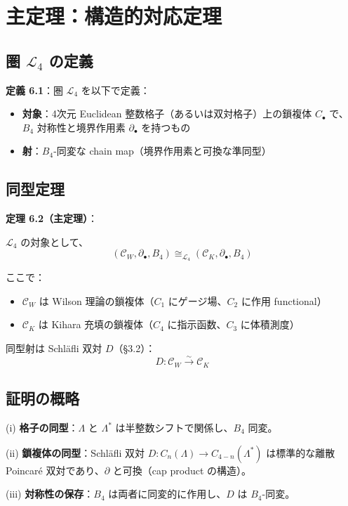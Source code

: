 \documentclass[a4paper,11pt]{ltjsarticle}
\begin{document}
\section{主定理：構造的対応定理}

\subsection{圏 $\mathcal{L}_4$ の定義}

\textbf{定義 6.1}：圏 $\mathcal{L}_4$ を以下で定義：

\begin{itemize}
\item \textbf{対象}：4次元 Euclidean 整数格子（あるいは双対格子）上の鎖複体 $C_\bullet$ で、$B_4$ 対称性と境界作用素 $\partial_\bullet$ を持つもの
\item \textbf{射}：$B_4$-同変な chain map（境界作用素と可換な準同型）
\end{itemize}

\subsection{同型定理}

\textbf{定理 6.2（主定理）}：

$\mathcal{L}_4$ の対象として、
\[ (\mathcal{C}_W, \partial_\bullet, B_4) \cong_{\mathcal{L}_4} (\mathcal{C}_K, \partial_\bullet, B_4) \]

ここで：
\begin{itemize}
\item $\mathcal{C}_W$ は Wilson 理論の鎖複体（$C_1$ にゲージ場、$C_2$ に作用 functional）
\item $\mathcal{C}_K$ は Kihara 充填の鎖複体（$C_4$ に指示函数、$C_3$ に体積測度）
\end{itemize}

同型射は Schläfli 双対 $D$（§3.2）：
\[ D : \mathcal{C}_W \xrightarrow{\sim} \mathcal{C}_K \]

\subsection{証明の概略}

(i) \textbf{格子の同型}：$\Lambda$ と $\Lambda^*$ は半整数シフトで関係し、$B_4$ 同変。

(ii) \textbf{鎖複体の同型}：Schläfli 双対 $D : C_n(\Lambda) \to C_{4-n}(\Lambda^*)$ は標準的な離散 Poincaré 双対であり、$\partial$ と可換（cap product の構造）。

(iii) \textbf{対称性の保存}：$B_4$ は両者に同変的に作用し、$D$ は $B_4$-同変。
\end{document}
